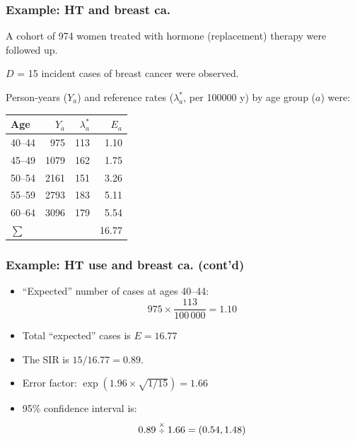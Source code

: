 \documentclass[handout,12pt]{beamer}
\begin{document}
\begin{frame} \frametitle{Example: HT and breast ca.}
\bi
\item
A cohort of 974 women treated with hormone (replacement) therapy
 were followed up. 
 \item
$D$ = 15 incident cases of breast cancer were
observed. 
\item 
Person-years ($Y_a$) and reference rates 
($\lambda_a^*$, per 100000 y)
by age group ($a$) were:
\ei
\small
\begin{center}
\begin{tabular}{lrrr}
Age & $Y_a$   & $\lambda_a^*$ & $E_a$ \\ 
\hline
40--44 \rule{0em}{1em} &  975 & 113 & 1.10 \\
45--49 & 1079 & 162 & 1.75 \\
50--54 & 2161 & 151 & 3.26 \\ 
55--59 & 2793 & 183 & 5.11 \\
60--64 & 3096 & 179 & 5.54 \\
\hline 
$\sum$ \rule{0em}{1em} & & & 16.77
\end{tabular}
\end{center}
\end{frame}

\begin{frame}
\frametitle{Example: HT use and breast ca. (cont'd)}

\begin{itemize} 
\item ``Expected'' number of cases at ages 40--44:
\[ 975 \times \frac{113}{100\,000} = 1.10 \]
\medskip
\item Total ``expected'' cases is $E = 16.77$
 \medskip 
\item The SIR is $15/16.77 = 0.89$.
 \medskip 
\item Error factor: $\exp(1.96\times \sqrt{1/15}) = 1.66$
 \medskip 
\item 95\% confidence interval is:
 \[ 0.89 \stackrel{\times}{\scriptstyle \div} 1.66 = (0.54, 1.48) \]
\end{itemize}


\end{frame} 
\end{document}
